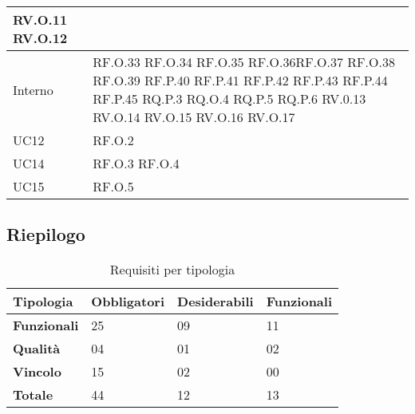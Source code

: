 \begin{longtable}{|C{3.0cm}|C{3.0cm}|}
RV.O.11 \newline
RV.O.12 \\
          \hline 
          Interno & 
          RF.O.33  \newline RF.O.34  \newline RF.O.35  \newline  RF.O.36\newline RF.O.37 \newline
          RF.O.38  \newline RF.O.39  \newline RF.P.40  \newline  RF.P.41 \newline RF.P.42 \newline
          RF.P.43  \newline RF.P.44 \newline RF.P.45  \newline  RQ.P.3  \newline RQ.O.4  \newline
          RQ.P.5  \newline RQ.P.6  \newline RV.0.13  \newline  RV.O.14   \newline RV.O.15   \newline
          RV.O.16   \newline RV.O.17   \\
          \hline       
          UC12 &RF.O.2 \\
          \hline 
          UC14 &RF.O.3  \newline RF.O.4 \\
          \hline 
          UC15 &    RF.O.5 \\
          \hline 

    \end{longtable}

\subsection{Riepilogo}
\begin{table}[H]
\centering
    \begin{tabular}{|C{3.0cm}|C{2.5cm}|C{2.5cm}|C{2.5cm}|}
        \hline
         \textbf{Tipologia} &
         \textbf{Obbligatori} & 
         \textbf{Desiderabili} &
         \textbf{Funzionali} 
          \\
          \hline
          \textbf{Funzionali} & 25 & 09 & 11 \\
          \hline 
          \textbf{Qualità} & 04 & 01 & 02\\
          \hline
          \textbf{Vincolo} & 15 & 02 & 00\\
          \hline
          \textbf{Totale} & 44 & 12 & 13\\
          \hline
    \end{tabular}
    \caption{Requisiti per tipologia}
\end{table}
